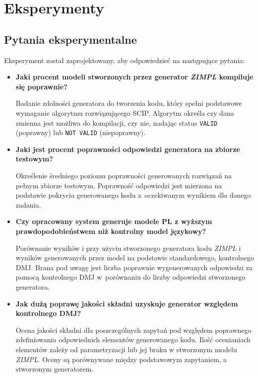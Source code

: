 
\chapter{Eksperymenty}\label{ch:experiment}

\section{Pytania eksperymentalne}

Eksperyment został zaprojektowany, aby odpowiedzieć na następujące pytania:
\begin{itemize}
    \item \textbf{Jaki procent modeli stworzonych przez generator  \textit{ZIMPL} kompiluje się poprawnie?}

Badanie zdolności generatora do tworzenia kodu, który spełni podstawowe wymaganie algorytmu rozwiązującego SCIP. Algorytm określa czy dana zmienna jest możliwa do kompilacji, czy nie, nadając status \texttt{VALID} (poprawny) lub \texttt{NOT VALID} (niepoprawny).

    \item \textbf{Jaki jest procent poprawności odpowiedzi generatora na zbiorze testowym?}

 Określenie średniego poziomu poprawności generowanych rozwiązań na pełnym zbiorze testowym. Poprawność odpowiedzi jest mierzona na podstawie pokrycia generowanego kodu z~oczekiwanym wynikiem dla danego zadania.
    
    \item \textbf{Czy opracowany system generuje modele PL z wyższym prawdopodobieństwem niż kontrolny model językowy?}

Porównanie wyników i przy użyciu stworzonego generatora kodu  \textit{ZIMPL} i wyników generowanych przez model na podstawie standardowego, kontrolnego DMJ. Brana pod uwagę jest liczba poprawnie wygenerowanych odpowiedzi za pomocą kontrolnego DMJ w~porównaniu do liczby odpowiedzi stworzonego generatora.
    
    \item \textbf{Jak dużą poprawę jakości składni uzyskuje generator względem kontrolnego DMJ?}

Ocena jakości składni dla poszczególnych zapytań pod względem poprawnego zdefiniowania odpowiednich elementów generowanego kodu. Ilość ocenianiach elementów zależy od parametryzacji lub jej braku w stworzonym modelu  \textit{ZIMPL}. Oceny są porównywane między podstawowym zapytaniem, a stworzonym generatorem.
    
\end{itemize}

